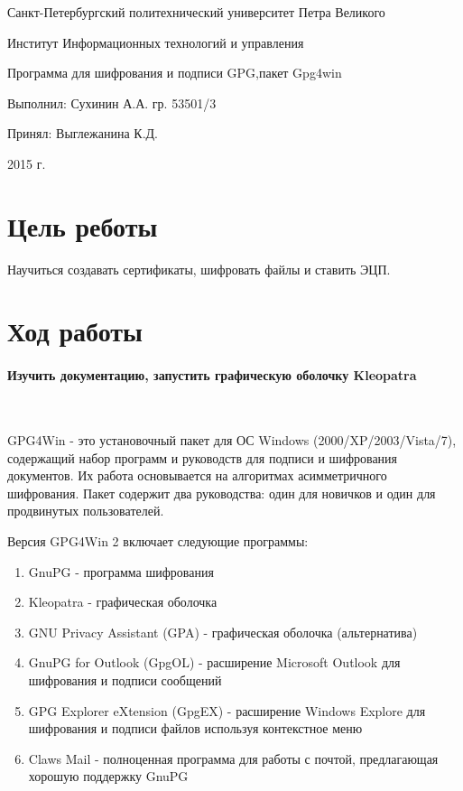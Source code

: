 \documentclass{article}
\begin{document}
\begin{titlepage} \begin{center}

	\Large			
Санкт-Петербургский политехнический университет Петра Великого
			
	\vspace{0.2cm}	
Институт Информационных технологий и управления
		
	\vspace{2cm} \vfill \huge
Программа для шифрования и подписи GPG,пакет Gpg4win	
		
	\vfill 
	\begin{flushleft} \large \hangindent=8cm 
Выполнил: Сухинин А.А. гр. 53501/3 \hrulefill
			
Принял: Выглежанина К.Д. \hrulefill
	\end{flushleft}
		
	\vspace{2cm} \vfill \LARGE
2015 г.
		
\end{center} \end{titlepage}


\section{Цель реботы} \label{Goal}
Научиться создавать сертификаты, шифровать файлы и ставить ЭЦП.

\section{Ход работы} \label{main}
\paragraph{Изучить документацию, запустить графическую оболочку Kleopatra}

~

GPG4Win - это установочный пакет для ОС Windows (2000/XP/2003/Vista/7), содержащий набор программ и руководств для подписи и шифрования документов. Их работа основывается на алгоритмах асимметричного шифрования. Пакет содержит два руководства: один для новичков и один для продвинутых пользователей.

Версия GPG4Win 2 включает следующие программы:
\begin{enumerate}
\item GnuPG - программа шифрования
\item Kleopatra - графическая оболочка
\item GNU Privacy Assistant (GPA) - графическая оболочка (альтернатива)
\item GnuPG for Outlook (GpgOL) - расширение Microsoft Outlook для шифрования и подписи сообщений
\item GPG Explorer eXtension (GpgEX) - расширение Windows Explore для шифрования и подписи файлов используя контекстное меню
\item Claws Mail - полноценная программа для работы с почтой, предлагающая хорошую поддержку GnuPG
\end{enumerate}
\end{document}
